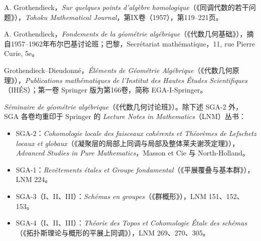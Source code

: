 \begin{description}[style=nextline,leftmargin=1.5em]
\item[TOHOKU]
A. Grothendieck，\textit{Sur quelques points d'algèbre homologique}（《同调代数的若干问题》），\textit{Tohoku Mathematical Journal}，第IX卷（1957），第119--221页。
\item[FONDEMENTS]
A. Grothendieck，\textit{Fondements de la géométrie algébrique}（《代数几何基础》），摘自1957--1962年布尔巴基讨论班；巴黎，Secrétariat mathématique，11, rue Pierre Curie, 5e。
\item[EGA；EGA-I-Springer]
Grothendieck--Dieudonné，\textit{Éléments de Géométrie Algébrique}（《代数几何原理》），\textit{Publications mathématiques de l'Institut des Hautes Études Scientifiques}（IHÉS）；第一卷 Springer 版为第166卷，简称 EGA-I-Springer。
\item[SGA-1-2-3-\ldots]
\textit{Séminaire de géométrie algébrique}（《代数几何讨论班》）。除下述 SGA-2 外，SGA 各卷均重印于 Springer 的 \textit{Lecture Notes in Mathematics}（LNM）丛书：
\begin{itemize}
\item SGA-2：\textit{Cohomologie locale des faisceaux cohérents et Théorèmes de Lefschetz locaux et globaux}（《凝聚层的局部上同调与局部及整体莱夫谢茨定理》），\textit{Advanced Studies in Pure Mathematics}，Masson et Cie 与 North-Holland。
\item SGA-1：\textit{Revêtements étales et Groupe fondamental}（《平展覆叠与基本群》），LNM 224。
\item SGA-3（I、II、III）：\textit{Schémas en groupes}（《群概形》），LNM 151、152、153。
\item SGA-4（I、II、III）：\textit{Théorie des Topos et Cohomologie Étale des schémas}（《拓扑斯理论与概形的平展上同调》），LNM 269、270、305。
\end{itemize}
\end{description}

